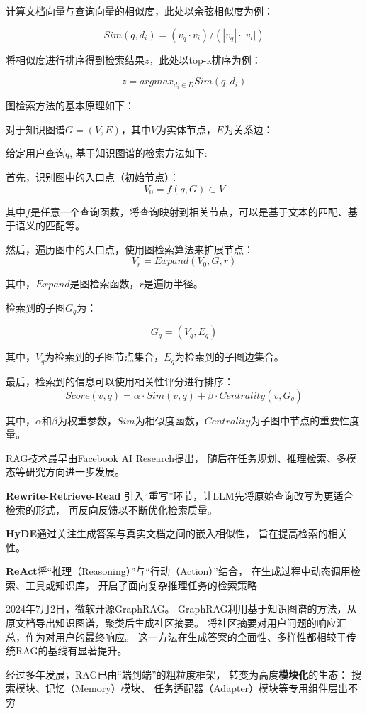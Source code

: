\documentclass{xmu}
\begin{document}
计算文档向量与查询向量的相似度，此处以余弦相似度为例：

$$
Sim(q,d_i) = (v_q \cdot v_i)/(|v_q|\cdot|v_i|)
$$

将相似度进行排序得到检索结果$z$，此处以top-k排序为例：

$$
z = argmax_{d_i \in D} Sim(q,d_i)
$$

图检索方法的基本原理如下：

对于知识图谱$G=(V,E)$，其中$V$为实体节点，$E$为关系边：

给定用户查询$q$, 基于知识图谱的检索方法如下:

首先，识别图中的入口点（初始节点）：
$$
V_0 = f(q, G) \subset V
$$

其中$f$是任意一个查询函数，将查询映射到相关节点，可以是基于文本的匹配、基于语义的匹配等。

然后，遍历图中的入口点，使用图检索算法来扩展节点：
$$
V_r = Expand(V_0, G, r)
$$

其中，$Expand$是图检索函数，$r$是遍历半径。

检索到的子图$G_q$为：

$$
G_q = (V_q, E_q)
$$

其中，$V_q$为检索到的子图节点集合，$E_q$为检索到的子图边集合。

最后，检索到的信息可以使用相关性评分进行排序：
$$
Score(v, q) = \alpha \cdot Sim(v, q) + \beta \cdot Centrality(v, G_q)
$$

其中，$\alpha$和$\beta$为权重参数，$Sim$为相似度函数，$Centrality$为子图中节点的重要性度量。

RAG技术最早由Facebook AI Research提出，
随后在任务规划、推理检索、多模态等研究方向进一步发展。

{\bf Rewrite-Retrieve-Read}
引入“重写”环节，让LLM先将原始查询改写为更适合检索的形式，
再反向反馈以不断优化检索质量\cite{RRR}。

{\bf HyDE}通过关注生成答案与真实文档之间的嵌入相似性，
旨在提高检索的相关性\cite{HyDE}。

{\bf ReAct}将“推理（Reasoning）”与“行动（Action）”结合，
在生成过程中动态调用检索、工具或知识库，
开启了面向复杂推理任务的检索策略

2024年7月2日，微软开源GraphRAG\cite{graphRAG}。
GraphRAG利用基于知识图谱的方法，从原文档导出知识图谱，聚类后生成社区摘要。
将社区摘要对用户问题的响应汇总，作为对用户的最终响应。
这一方法在生成答案的全面性、多样性都相较于传统RAG的基线有显著提升。

经过多年发展，RAG已由“端到端”的粗粒度框架，
转变为高度{\bf 模块化}的生态：
搜索模块、记忆（Memory）模块、
任务适配器（Adapter）模块等专用组件层出不穷 \cite{RAG}
\end{document}
